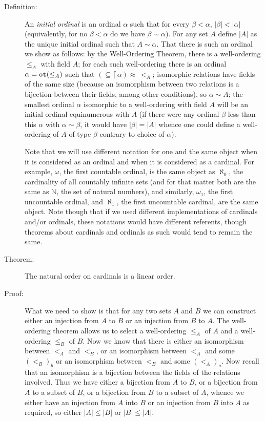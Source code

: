 \documentclass[12pt]{book}
\begin{document}
\begin{description}

\item[Definition:]  An {\em initial ordinal\/} is an ordinal $\alpha$ such that for every $\beta<\alpha$, $|\beta|<|\alpha|$ (equivalently, for no $\beta<\alpha$ do we have
$\beta \sim \alpha$).  For any set $A$ define $|A|$ as the unique initial ordinal such that $A \sim \alpha$.  That there is such an ordinal we show as follows:  by the Well-Ordering Theorem, there is a well-ordering $\leq_A$ with field $A$;  for each such well-ordering there is an ordinal $\alpha={\tt ot}(\leq_A)$ such that $(\subseteq \lceil \,\alpha) \approx \,<_A$;  isomorphic relations have fields of the same size (because an isomorphism between two relations is a bijection between their fields, among other conditions), so $\alpha \sim A$;  the smallest ordinal $\alpha$ isomorphic to a well-ordering with field $A$ will be an initial ordinal equinumerous with $A$ (if there were any ordinal $\beta$ less than this $\alpha$ with $\alpha \sim \beta$, it would have $|\beta| = |A|$ whence one could define a well-ordering of $A$ of type $\beta$ contrary to choice of $\alpha$).

Note that we will use different notation for one and the same object when it is considered as an ordinal and when it is considered as a cardinal.  For example, $\omega$, the first countable ordinal, is the same object as $\aleph_0$, the cardinality of all countably infinite sets (and for that matter both are the same as $\mathbb N$, the set of natural numbers),
and similarly, $\omega_1$, the first uncountable ordinal, and $\aleph_1$, the first uncountable cardinal, are the same object.  Note though that if we used different implementations of cardinals and/or ordinals, these notations would have different referents, though theorems about cardinals and ordinals as such would tend to remain the same.

\item[Theorem:]  The natural order on cardinals is a linear order.

\item[Proof:]  What we need to show is that for any two sets $A$ and $B$ we can construct either an injection from $A$ to $B$ or an injection from $B$ to $A$.  The well-ordering theorem allows us to select a well-ordering $\leq_A$ of $A$ and a well-ordering $\leq_B$ of $B$.  Now we know that there is either an isomorphism between $<_A$ and $<_B$, or an isomorphism between $<_A$ and some $(<_B)_b$ or an isomorphism between $<_B$ and
some $(<_A)_a$.  Now recall that an isomorphism is a bijection between the fields of the relations involved.  Thus we have either a bijection from $A$ to $B$, or a bijection from $A$ to a subset of $B$, or a bijection from $B$ to a subset of $A$, whence we either have an injection from $A$ into $B$
or an injection from $B$ into $A$ as required, so either $|A| \leq |B|$ or $|B| \leq |A|$.


\end{description}
\end{document}
